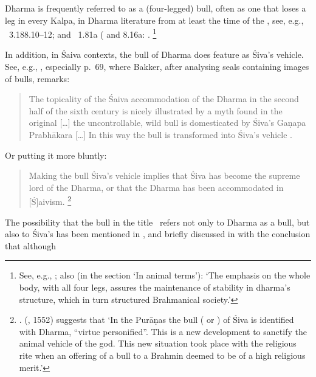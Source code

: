 Dharma is frequently referred to as a (four-legged) 
bull, often as one that loses a leg in every Kalpa,
in Dharma literature from at least the time of the \MBh,
see, e.g., \MBH\ 3.188.10--12; and \Manu\ 1.81a 
( and 8.16a: 
.%
	 \footnote{See, e.g., ; also  
	 (in the section `In animal terms'): 
	 `The emphasis on the whole body, with all four legs, assures 
	 the maintenance of stability in dharma's structure, which in 
	 turn structured Brahmanical society.'}

In addition, in Śaiva contexts, the bull of Dharma
does feature as Śiva's vehicle. See, e.g., 
, especially p.~69,
where Bakker, after analysing seals containing images of
bulls, remarks:

\begin{quote}
The topicality of the Śaiva accommodation 
of the Dharma in the second half of the 
sixth century is nicely illustrated by a myth found in the
original  [\dots]
the uncontrollable, wild bull  is 
domesticated by Śiva's Gaṇapa Prabhākara [\dots]
In this way the bull is transformed into Śiva’s vehicle . 
\end{quote}

\noindent
Or putting it more bluntly: 

\begin{quote}
Making the bull Śiva's vehicle implies that Śiva has become
the supreme lord of the Dharma, or that the Dharma has 
been accommodated in [Ś]aivism.%
	\footnote{.
	\citeauthor{bhattacharya_nandin_1977} 		
			(\citeyear{bhattacharya_nandin_1977}, {1552}) 
			suggests that `In the Purāṇas the bull
		( or 
		) 
	of Śiva is identified with Dharma, ``virtue personified''. 
		This is a new development to sanctify the animal 
		vehicle of the god. This new situation took place with the 		
		religious rite when an offering of a bull to a Brahmin   
		deemed to be	of a high religious merit.'}
\end{quote}

\noindent
The possibility that the bull in the title \Vss\ refers 
not only to Dharma as a bull, but also
to Śiva's  has been mentioned
in , and briefly
discussed in  
with the conclusion that although 

